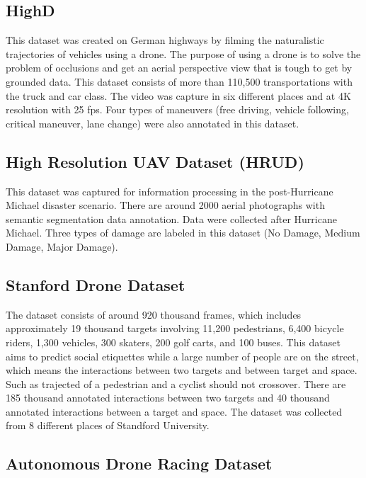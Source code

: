 \subsection{HighD}
This dataset was created on German highways by filming the naturalistic trajectories of vehicles using a drone. The purpose of using a drone is to solve the problem of occlusions and get an aerial perspective view that is tough to get by grounded data. This dataset consists of more than 110,500 transportations with the truck and car class. The video was capture in six different places and at 4K resolution with 25 fps. Four types of maneuvers (free driving, vehicle following, critical maneuver, lane change) were also annotated in this dataset.

\subsection{High Resolution UAV Dataset (HRUD)}
This dataset was captured for information processing in the post-Hurricane Michael disaster scenario. There are around 2000 aerial photographs with semantic segmentation data annotation. Data were collected after Hurricane Michael. Three types of damage are labeled in this dataset (No Damage, Medium Damage, Major Damage).


\subsection{Stanford Drone Dataset}

The dataset consists of around 920 thousand frames, which includes approximately 19 thousand targets involving 11,200 pedestrians, 6,400 bicycle riders, 1,300 vehicles, 300 skaters, 200 golf carts, and 100 buses. This dataset aims to predict social etiquettes while a large number of people are on the street, which means the interactions between two targets and between target and space. Such as trajected of a pedestrian and a cyclist should not crossover. %
There are 185 thousand annotated interactions between two targets and 40 thousand annotated interactions between a target and space. The dataset was collected from 8 different places of Standford University.


\subsection{Autonomous Drone Racing Dataset}

